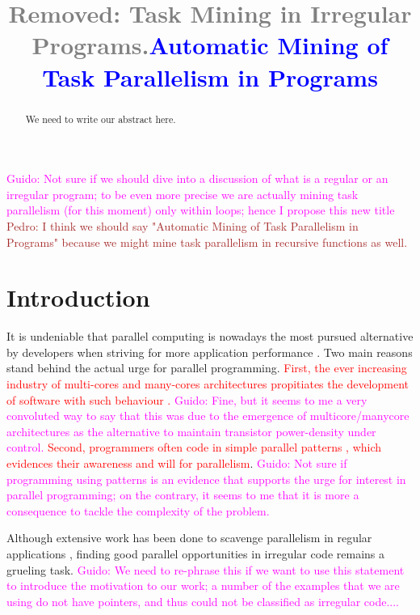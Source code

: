 \documentclass[pageno]{jpaper}
\newcommand{\guido}[1]{\noindent\textcolor{magenta}{Guido: {#1}}}
\newcommand{\pedro}[1]{\noindent\textcolor{brown}{Pedro: {#1}}}
\newcommand{\rmv}[1]{\noindent\textcolor{gray}{Removed: {#1}}}
\newcommand{\new}[1]{\noindent\textcolor{blue}{ {#1}}}
\newcommand{\ed}[1]{\noindent\textcolor{red}{ {#1}}}
\newcommand{\guido}[1]{}
\newcommand{\pedro}[1]{}
\newcommand{\rmv}[1]{}
\newcommand{\new}[1]{#1}
\newcommand{\ed}[1]{}
\begin{document}
\guido{Not sure if we should dive into a discussion of what is a regular or an irregular program; to be even more precise we are actually mining task parallelism (for this moment) only within loops; hence I propose this new title}
\pedro{I think we should say "Automatic Mining of Task Parallelism in Programs" because we might mine task parallelism in recursive functions as well.}
\title{\rmv{Task Mining in Irregular Programs.}\new{Automatic Mining of Task Parallelism in Programs}}

\date{}
\maketitle

\thispagestyle{empty}

\begin{abstract}
We need to write our abstract here.
\end{abstract}

\section{Introduction}
\label{sec:intro}


It is undeniable that parallel computing is nowadays the most pursued alternative by developers  when striving for more application performance \cite{hwu2014ahead}. Two main reasons stand behind  the actual urge for parallel programming. \ed{First, the ever  increasing industry of multi-cores and many-cores architectures propitiates the development of software  with such behaviour \cite{haugen2016performance, vandierendonck2013analysis}.} \guido{Fine, but it seems to me a very convoluted way to say that this was due to the emergence of multicore/manycore  architectures as the alternative to maintain transistor power-density under control.} \ed{Second, programmers often code in simple parallel patterns  \cite{pinto2015large}, which evidences their awareness and will for parallelism}. \guido{Not sure if programming using patterns is an evidence that supports the urge for interest in parallel programming; on the contrary, it seems to me that it is more a consequence to tackle the complexity of the problem.} 

Although extensive  work has been done to scavenge parallelism in regular applications \cite{kulkarni2009much}, finding good  parallel opportunities in irregular code remains a grueling task. \guido{We need to re-phrase this if we want to use this statement to introduce the motivation to our work; a number of the examples that we are using do not have pointers, and thus could not be classified as irregular code....} 
\end{document}
